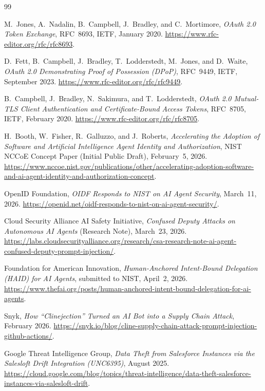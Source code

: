 \documentclass[11pt]{article}
\begin{document}
\begin{thebibliography}{99}

 M.~Jones, A.~Nadalin, B.~Campbell, J.~Bradley, and C.~Mortimore,
\emph{OAuth 2.0 Token Exchange}, RFC~8693, IETF, January 2020.
\url{https://www.rfc-editor.org/rfc/rfc8693}.

 D.~Fett, B.~Campbell, J.~Bradley, T.~Lodderstedt, M.~Jones, and
D.~Waite, \emph{OAuth 2.0 Demonstrating Proof of Possession (DPoP)}, RFC~9449,
IETF, September 2023. \url{https://www.rfc-editor.org/rfc/rfc9449}.

 B.~Campbell, J.~Bradley, N.~Sakimura, and T.~Lodderstedt,
\emph{OAuth 2.0 Mutual-TLS Client Authentication and Certificate-Bound Access
Tokens}, RFC~8705, IETF, February 2020.
\url{https://www.rfc-editor.org/rfc/rfc8705}.

 H.~Booth, W.~Fisher, R.~Galluzzo, and J.~Roberts,
\emph{Accelerating the Adoption of Software and Artificial Intelligence Agent
Identity and Authorization}, NIST NCCoE Concept Paper (Initial Public Draft),
February~5, 2026.
\url{https://www.nccoe.nist.gov/publications/other/accelerating-adoption-software-and-ai-agent-identity-and-authorization-concept}.

 OpenID Foundation, \emph{OIDF Responds to NIST on AI Agent
Security}, March~11, 2026.
\url{https://openid.net/oidf-responds-to-nist-on-ai-agent-security/}.

 Cloud Security Alliance AI Safety Initiative, \emph{Confused
Deputy Attacks on Autonomous AI Agents} (Research Note), March~23, 2026.
\url{https://labs.cloudsecurityalliance.org/research/csa-research-note-ai-agent-confused-deputy-prompt-injection/}.

 Foundation for American Innovation, \emph{Human-Anchored
Intent-Bound Delegation (HAID) for AI Agents}, submitted to NIST, April~2, 2026.
\url{https://www.thefai.org/posts/human-anchored-intent-bound-delegation-for-ai-agents}.

 Snyk, \emph{How ``Clinejection'' Turned an AI Bot into a
Supply Chain Attack}, February 2026.
\url{https://snyk.io/blog/cline-supply-chain-attack-prompt-injection-github-actions/}.

 Google Threat Intelligence Group, \emph{Data Theft from
Salesforce Instances via the Salesloft Drift Integration (UNC6395)}, August 2025.
\url{https://cloud.google.com/blog/topics/threat-intelligence/data-theft-salesforce-instances-via-salesloft-drift}.


\end{thebibliography}
\end{document}
